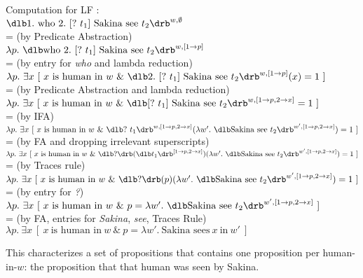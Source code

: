 \noindent\begin{minipage}{1.5\textwidth}
\ex Computation for LF \Last:\label{ex:wh-comp}\\
$\sv{1.\ \text{who}\ 2.\ [?\ t_{1}]\ \text{Sakina see}\ t_{2}}^{w,\emptyset}$\\
{\small = (by Predicate Abstraction)}\\
$\lambda p.\ \sv{\text{who}\ 2.\ [?\ t_{1}]\ \text{Sakina
    see}\ t_{2}}^{w,[1\rightarrow p]}$\\
{\small = (by entry for \emph{who} and lambda reduction)}\\
$\lambda p.\ \exists x\ [\ x\ \text{is human in}\ w\ \&\ \sv{2.\ [?\ t_{1}]\ \text{Sakina
    see}\ t_{2}}^{w,[1\rightarrow p]}(x) = 1\ ]$\\
{\small = (by Predicate Abstraction and lambda reduction)}\\
$\lambda p.\ \exists x\ [\ x\ \text{is human in}\ w\ \&\ \sv{[?\ t_{1}]\ \text{Sakina
    see}\ t_{2}}^{w,[1\rightarrow p,2\rightarrow x]} = 1\ ]$\\
{\small = (by IFA)}\\
$\lambda p.\ \exists x\ [\ x\ \text{is human
  in}\ w\ \&\ \sv{?\ t_{1}}^{w,[1\rightarrow p,2\rightarrow x]}(\lambda w'.\ \sv{\text{Sakina
    see}\ t_{2}}^{w',[1\rightarrow p,2\rightarrow x]}) = 1\ ]$\\
{\small = (by FA and dropping irrelevant superscripts)}\\
$\lambda p.\ \exists x\ [\ x\ \text{is human
  in}\ w\ \&\ \svt{?}(\sv{t_{1}}^{[1\rightarrow p,2\rightarrow x]})(\lambda w'.\ \sv{\text{Sakina
    see}\ t_{2}}^{w',[1\rightarrow p,2\rightarrow x]}) = 1\ ]$\\
{\small = (by Traces rule)}\\
$\lambda p.\ \exists x\ [\ x\ \text{is human
  in}\ w\ \&\ \svt{?}(p)(\lambda w'.\ \sv{\text{Sakina
    see}\ t_{2}}^{w',[1\rightarrow p,2\rightarrow x]}) = 1\ ]$\\
{\small = (by entry for \emph{?})}\\
$\lambda p.\ \exists x\ [\ x\ \text{is human
  in}\ w\ \&\ p = \lambda w'.\ \sv{\text{Sakina
    see}\ t_{2}}^{w',[1\rightarrow p,2\rightarrow x]}\ ]$\\
{\small = (by FA, entries for \emph{Sakina}, \emph{see}, Traces Rule)}\\
$\lambda p.\ \exists x\ [\ x\ \text{is human
  in}\ w\ \&\ p = \lambda w'.\ \text{Sakina
  sees}\ x\ \text{in}\ w'\ ]$\\
\xe
\end{minipage}
%
%
This characterizes a set of propositions that contains one proposition per
human-in-$w$: the proposition that that human was seen by Sakina.

